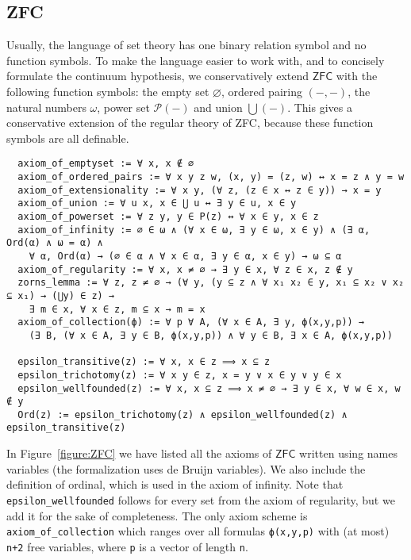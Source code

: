 \documentclass[sigplan,10pt,review]{acmart}
\newcommand{\ZFC}{\mathsf{ZFC}}
\theoremstyle{definition}
\begin{document}
\subsection{ZFC}
\label{subsect:fol:zfc}

Usually, the language of set theory has one binary relation symbol and no function symbols.
To make the language easier to work with, and to concisely formulate the continuum hypothesis, we conservatively extend \(\ZFC\) with the following function symbols: the empty set \(\varnothing\), ordered pairing \(({-},{-})\), the natural numbers \(\omega\), power set \(\mathcal{P}({-})\) and union \(\bigcup({-})\).
This gives a conservative extension of the regular theory of ZFC, because these function symbols are all definable.
\begin{figure*}
  \begin{center}
  \begin{minipage}{0.84\textwidth}
  \begin{lstlisting}
  axiom_of_emptyset := ∀ x, x ∉ ∅
  axiom_of_ordered_pairs := ∀ x y z w, (x, y) = (z, w) ↔ x = z ∧ y = w
  axiom_of_extensionality := ∀ x y, (∀ z, (z ∈ x ↔ z ∈ y)) → x = y
  axiom_of_union := ∀ u x, x ∈ ⋃ u ↔ ∃ y ∈ u, x ∈ y
  axiom_of_powerset := ∀ z y, y ∈ P(z) ↔ ∀ x ∈ y, x ∈ z
  axiom_of_infinity := ∅ ∈ ω ∧ (∀ x ∈ ω, ∃ y ∈ ω, x ∈ y) ∧ (∃ α, Ord(α) ∧ ω = α) ∧
    ∀ α, Ord(α) → (∅ ∈ α ∧ ∀ x ∈ α, ∃ y ∈ α, x ∈ y) → ω ⊆ α
  axiom_of_regularity := ∀ x, x ≠ ∅ → ∃ y ∈ x, ∀ z ∈ x, z ∉ y
  zorns_lemma := ∀ z, z ≠ ∅ → (∀ y, (y ⊆ z ∧ ∀ x₁ x₂ ∈ y, x₁ ⊆ x₂ ∨ x₂ ⊆ x₁) → (⋃y) ∈ z) →
    ∃ m ∈ x, ∀ x ∈ z, m ⊆ x → m = x
  axiom_of_collection(ϕ) := ∀ p ∀ A, (∀ x ∈ A, ∃ y, ϕ(x,y,p)) →
    (∃ B, (∀ x ∈ A, ∃ y ∈ B, ϕ(x,y,p)) ∧ ∀ y ∈ B, ∃ x ∈ A, ϕ(x,y,p))

  epsilon_transitive(z) := ∀ x, x ∈ z ⟹ x ⊆ z
  epsilon_trichotomy(z) := ∀ x y ∈ z, x = y ∨ x ∈ y ∨ y ∈ x
  epsilon_wellfounded(z) := ∀ x, x ⊆ z ⟹ x ≠ ∅ → ∃ y ∈ x, ∀ w ∈ x, w ∉ y
  Ord(z) := epsilon_trichotomy(z) ∧ epsilon_wellfounded(z) ∧ epsilon_transitive(z)
  \end{lstlisting}
  \end{minipage}
  \caption{Our formulation of ZFC.}
  \label{figure:ZFC}
  \end{center}
\end{figure*}

In Figure~\ref{figure:ZFC} we have listed all the axioms of \(\ZFC\) written using names variables (the formalization uses de Bruijn variables). We also include the definition of ordinal, which is used in the axiom of infinity. Note that \lstinline{epsilon_wellfounded} follows for every set from the axiom of regularity, but we add it for the sake of completeness. The only axiom scheme is \lstinline{axiom_of_collection} which ranges over all formulas \lstinline{ϕ(x,y,p)} with (at most) \lstinline{n+2} free variables, where \lstinline{p} is a vector of length \lstinline{n}.
\end{document}

